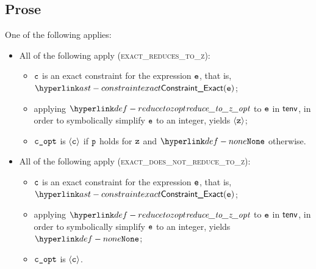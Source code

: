 \subsection{Prose}
One of the following applies:
\begin{itemize}
  \item All of the following apply (\textsc{exact\_reduces\_to\_z}):
  \begin{itemize}
    \item $\texttt{c}$ is an exact constraint for the expression $\texttt{e}$, that is, $\ConstraintExact(\ve)$;
    \item applying $\reducetozopt$ to $\texttt{e}$ in $\textsf{tenv}$, in order to symbolically simplify $\texttt{e}$ to an integer,
          yields $\langle\texttt{z}\rangle$;
    \item $\texttt{c\_opt}$ is $\langle\texttt{c}\rangle$ if $\texttt{p}$ holds for $\texttt{z}$ and $\None$ otherwise.
  \end{itemize}

  \item All of the following apply (\textsc{exact\_does\_not\_reduce\_to\_z}):
  \begin{itemize}
    \item $\texttt{c}$ is an exact constraint for the expression $\texttt{e}$, that is, $\ConstraintExact(\ve)$;
    \item applying $\reducetozopt$ to $\texttt{e}$ in $\textsf{tenv}$, in order to symbolically simplify $\texttt{e}$ to an integer,
          yields $\None$;
    \item $\texttt{c\_opt}$ is $\langle\texttt{c}\rangle$.
  \end{itemize}


\end{itemize}
